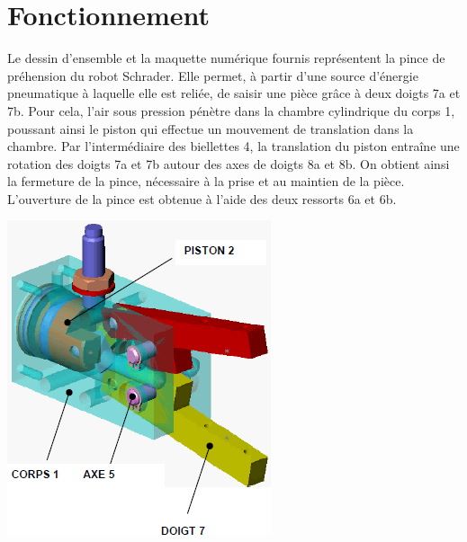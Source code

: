 \documentclass[11pt,oneside]{article}
\begin{document}
\section*{Fonctionnement}

\begin{minipage}[c]{.7\linewidth}
Le dessin d'ensemble et la maquette numérique fournis
représentent la pince de préhension du robot Schrader. Elle permet,
à partir d'une source d'énergie pneumatique à laquelle elle est
reliée, de saisir une pièce grâce à deux doigts 7a et 7b. Pour cela,
l’air sous pression pénètre dans la chambre cylindrique du corps 1,
poussant ainsi le piston qui effectue un mouvement de translation
dans la chambre. Par l’intermédiaire des biellettes 4, la translation
du piston entraîne une rotation des doigts 7a et 7b autour des axes
de doigts 8a et 8b. On obtient ainsi la fermeture de la pince,
nécessaire à la prise et au maintien de la pièce. L’ouverture de la
pince est obtenue à l’aide des deux ressorts 6a et 6b.
\end{minipage}
\begin{minipage}[c]{.25\linewidth}
\hfill
\begin{center}
\includegraphics[width=.9\textwidth]{png/fig4}
\end{center}
\end{minipage}
\end{document}
